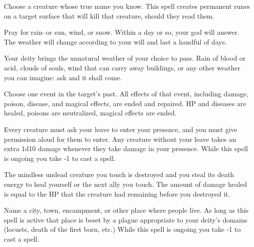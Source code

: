 

 Choose a creature whose true name you know. This spell creates permanent runes on a target surface that will kill that creature, should they read them.




 Pray for rain--or sun, wind, or snow. Within a day or so, your god will answer. The weather will change according to your will and last a handful of days.




 Your deity brings the unnatural weather of your choice to pass. Rain of blood or acid, clouds of souls, wind that can carry away buildings, or any other weather you can imagine: ask and it shall come.




 Choose one event in the target's past. All effects of that event, including damage, poison, disease, and magical effects, are ended and repaired. HP and diseases are healed, poisons are neutralized, magical effects are ended.





 Every creature must ask your leave to enter your presence, and you must give permission aloud for them to enter. Any creature without your leave takes an extra 1d10 damage whenever they take damage in your presence. While this spell is ongoing you take -1 to cast a spell.




 The mindless undead creature you touch is destroyed and you steal its death energy to heal yourself or the next ally you touch. The amount of damage healed is equal to the HP that the creature had remaining before you destroyed it.





 Name a city, town, encampment, or other place where people live. As long as this spell is active that place is beset by a plague appropriate to your deity's domains (locusts, death of the first born, etc.) While this spell is ongoing you take -1 to cast a spell.


